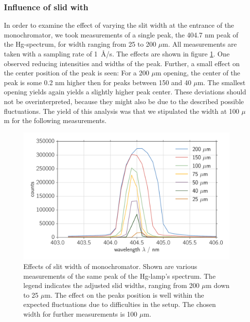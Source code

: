 \subsubsection{Influence of slid with}
In order to examine the effect of varying the slit width at the entrance of the monochromator, we took measurements of a 
single peak, the 404.7 nm peak of the Hg-spectrum, for width ranging from 25 to 200 $\mu$m. All measurements are taken 
with a sampling rate of 1~\AA/s. The effects are shown in 
figure \ref{fig:mono_slit}. One observed reducing intensities and widths of the peak. Further, a small effect on the 
center position of the peak is seen: For a 200 $\mu$m opening, the center of the peak is some 0.2 nm higher then for peaks 
between 150 and 40 $\mu$m. The smallest opening yields again yields a slightly higher peak center. These deviations should 
not be overinterpreted, because they might also be due to the described possible fluctuations. The yield of this analysis 
was that we stipulated the width at 100 $\mu$m for the following measurements. 

\begin{figure}[htpb]
    \centering
    \includegraphics[width=0.8\linewidth]{analysis/figures/mono_slit}
    \caption{Effects of slit width of monochromator. Shown are various measurements of the same peak of the Hg-lamp's
    spectrum. The legend indicates the adjusted slid widths, ranging from 200 $\mu$m down to 25 $\mu$m. The effect 
    on the peaks position is well within the expected fluctuations due to difficulties in the setup. The chosen 
    width for further measurements is 100 $\mu$m. }
    \label{fig:mono_slit}
\end{figure}

